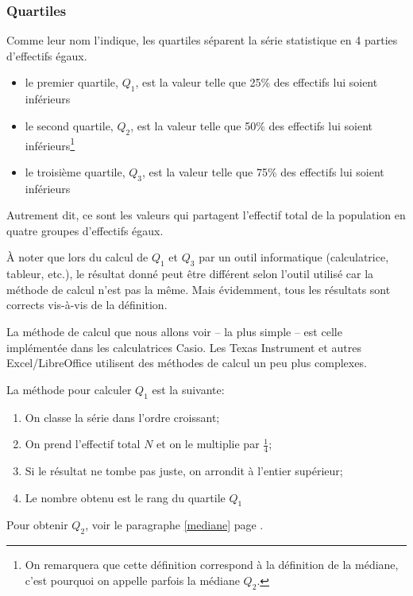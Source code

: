 \documentclass[a4paper,12pt]{scrartcl}
\begin{document}
\subsubsection{Quartiles}

Comme leur nom l'indique, les quartiles séparent la série statistique en 4 parties d'effectifs égaux.

\begin{itemize}
\item le premier quartile, $Q_1$, est la valeur telle que 25\% des effectifs lui soient inférieurs
\item le second quartile, $Q_2$, est la valeur telle que 50\% des effectifs lui soient inférieurs\footnote{On remarquera que cette définition correspond à la définition de la médiane, c'est pourquoi on appelle parfois la médiane $Q_2$.}
\item le troisième quartile, $Q_3$, est la valeur telle que 75\% des effectifs lui soient inférieurs
\end{itemize}

Autrement dit, ce sont les valeurs qui partagent l'effectif total de la population en quatre groupes d'effectifs égaux. 

À noter que lors du calcul de $Q_1$ et $Q_3$ par un outil informatique (calculatrice, tableur, etc.), le résultat donné peut être différent selon l'outil utilisé car la méthode de calcul n'est pas la même. Mais évidemment, tous les résultats sont corrects vis-à-vis de la définition.

La méthode de calcul que nous allons voir -- la plus simple -- est celle implémentée dans les calculatrices Casio. Les Texas Instrument et autres Excel/LibreOffice utilisent des méthodes de calcul un peu plus complexes. 

La méthode pour calculer $Q_1$ est la suivante:

\begin{enumerate}
\item On classe la série dans l'ordre croissant;
\item \label{calculQ1} On prend l'effectif total $N$ et on le multiplie par $\frac{1}{4}$;
\item Si le résultat ne tombe pas juste, on arrondit à l'entier supérieur;
\item Le nombre obtenu est le rang du quartile $Q_1$
\end{enumerate}

Pour obtenir $Q_2$, voir le paragraphe \ref{mediane} page \pageref{mediane}.
\end{document}
